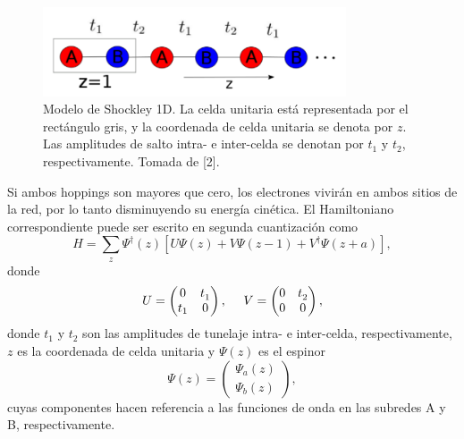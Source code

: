 \documentclass{article}
\begin{document}
\begin{figure}[th!]
\centering
   \includegraphics[width=0.8\textwidth]{shockley.png}
   \caption{Modelo de Shockley 1D. La celda unitaria está representada por el rectángulo gris, y la coordenada de celda unitaria se denota por $z$. Las amplitudes de salto intra- e inter-celda se denotan por $t_1$ y $t_2$, respectivamente. Tomada de [2].}
\end{figure}

Si ambos hoppings son mayores que cero, los electrones vivirán en ambos sitios de la red, por lo tanto disminuyendo su energía cinética. El Hamiltoniano correspondiente puede ser escrito en segunda cuantización como
\begin{equation}
H = \sum_z \Psi^{\dagger}(z)\left[U\Psi(z)+V\Psi(z-1)+V^{\dagger}\Psi(z+a)\right],     
\end{equation}
donde 
\[U=
\begin{pmatrix}
0 & t_1^{\*} \\
t_1 & 0 
\end{pmatrix}, \ \ \ \ 
V=
\begin{pmatrix}
0 & t_2^{\*} \\
0 & 0 
\end{pmatrix},
\]
donde $t_1$ y $t_2$ son las amplitudes de tunelaje intra- e inter-celda, respectivamente, $z$ es la coordenada de celda unitaria y $\Psi(z)$ es el espinor
\begin{equation}
    \Psi(z)=\begin{pmatrix}
\Psi_a(z) \\
\Psi_b(z) 
\end{pmatrix},
\end{equation}
cuyas componentes hacen referencia a las funciones de onda en las subredes A y B, respectivamente.\\
\end{document}
